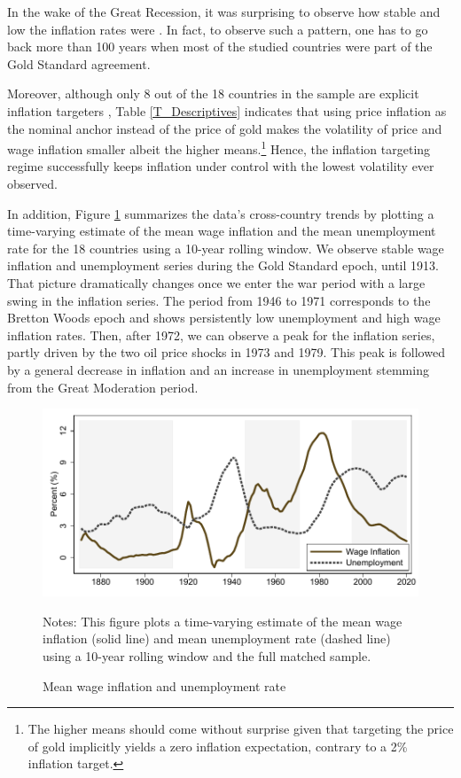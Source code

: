 \documentclass[12pt]{article}
\newcommand{\annote}[1]{\parbox{\textwidth}{\renewcommand{\baselinestretch}{1.0}\vspace{12pt} \footnotesize Notes: #1}}
\begin{document}
In the wake of the Great Recession, it was surprising to observe how stable and low the inflation rates were \citep{Miles2017}. In fact, to observe such a pattern, one has to go back more than 100 years when most of the studied countries were part of the Gold Standard agreement.

Moreover, although only 8 out of the 18 countries in the sample are explicit inflation targeters \citep{Svensson2010}, Table \ref{T_Descriptives} indicates that using price inflation as the nominal anchor instead of the price of gold makes the volatility of price and wage inflation smaller albeit the higher means.\footnote{The higher means should come without surprise given that targeting the price of gold implicitly yields a zero inflation expectation, contrary to a 2\% inflation target.} Hence, the inflation targeting regime successfully keeps inflation under control with the lowest volatility ever observed.

In addition, Figure \ref{F_median} summarizes the data's cross-country trends by plotting a time-varying estimate of the mean wage inflation and the mean unemployment rate for the 18 countries using a 10-year rolling window. We observe stable wage inflation and unemployment series during the Gold Standard epoch, until 1913. That picture dramatically changes once we enter the war period with a large swing in the inflation series. The period from 1946 to 1971 corresponds to the Bretton Woods epoch and shows persistently low unemployment and high wage inflation rates. Then, after 1972, we can observe a peak for the inflation series, partly driven by the two oil price shocks in 1973 and 1979. This peak is followed by a general decrease in inflation and an increase in unemployment stemming from the Great Moderation period.

\begin{figure}[ht]
    \centering
    \caption{Mean wage inflation and unemployment rate}
    \includegraphics[width=\textwidth]{../Output/Figures/Median_dwn_unemp_paper.pdf}
    \annote{\footnotesize This figure plots a time-varying estimate of the mean wage inflation (solid line) and mean unemployment rate (dashed line) using a 10-year rolling window and the full matched sample.}
    \label{F_median}
\end{figure}
\end{document}
